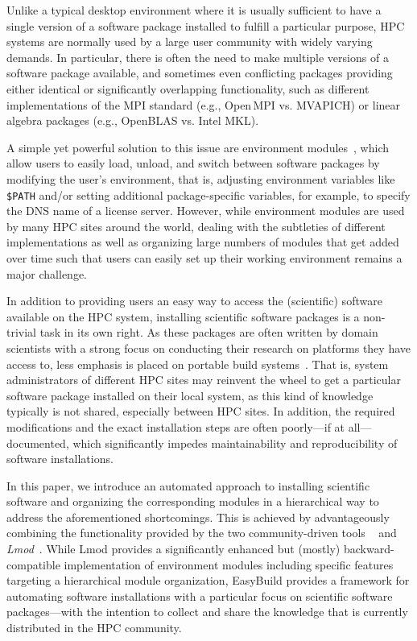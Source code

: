 Unlike a typical desktop environment where it is usually sufficient to have a
single version of a software package installed to fulfill a particular purpose, HPC
systems are normally used by a large user community with widely varying
demands. In particular, there is often the need to make multiple versions of
a software package available, and sometimes even conflicting packages
providing either identical or significantly overlapping functionality, such
as different implementations of the MPI standard (e.g., Open\,MPI vs.
MVAPICH) or linear algebra packages (e.g., OpenBLAS vs. Intel MKL).

A simple yet powerful solution to this issue are environment
modules~\cite{furlani91,furlani96,eadline,laytonEM1}, which allow
users to easily load, unload, and switch between software packages by
modifying the user's environment, that is, adjusting environment
variables like \texttt{\$PATH} and/or setting additional package-specific
variables, for example, to specify the DNS name of a
license server. However, while environment modules are used by many
HPC sites around the world, dealing with the subtleties of different
implementations as well as organizing large numbers of modules that
get added over time such that users can easily set up their working environment
remains a major challenge.

In addition to providing users an easy way to access the (scientific) software
available on the HPC system, installing scientific software packages is a
non-trivial task in its own right. As these packages are often written by domain
scientists with a strong focus on conducting their research on platforms
they have access to, less emphasis is placed on portable build
systems~\cite{Dubois03}. That
is, system administrators of different HPC sites may reinvent the wheel to
get a particular software package installed on their local system, as this
kind of knowledge typically is not shared, especially between HPC sites. In
addition, the required modifications and the exact installation steps are
often poorly---if at all---documented, which significantly impedes
maintainability and reproducibility of software installations.

In this paper, we introduce an automated approach to installing scientific
software and organizing the corresponding modules in a hierarchical way to
address the aforementioned shortcomings. This is achieved by advantageously
combining the functionality provided by the two community-driven tools
\emph{\easybuild{}}~\cite{EasyBuildSC12} and \emph{Lmod}~\cite{taccLmod}.
While Lmod provides a significantly enhanced but
(mostly) backward-compatible implementation of environment modules including specific
features targeting a hierarchical module organization, EasyBuild provides a
framework for automating software installations with a particular focus on
scientific software packages---with the intention to collect and share the
knowledge that is currently distributed in the HPC community.

